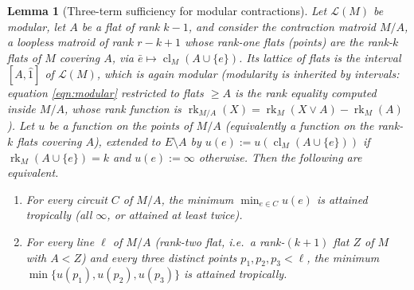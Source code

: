 \documentclass{article}
\newtheorem{lemma}[theorem]{Lemma}
\theoremstyle{definition}
\newcommand{\rk}{\operatorname{rk}}
\newcommand{\cl}{\operatorname{cl}}
\newcommand{\cLL}{\mathcal{L}}
\begin{document}
\begin{lemma}[Three-term sufficiency for modular contractions]\label{lem:modline-circuit}
Let $\cLL(M)$ be modular, let $A$ be a flat of rank $k-1$, and consider the contraction matroid
$M/A$, a loopless matroid of rank $r-k+1$ whose rank-one flats (points) are the rank-$k$ flats of $M$
covering $A$, via $\bar e\mapsto\cl_M(A\cup\{e\})$. Its lattice of flats is the interval $[A,\hat1]$ of
$\cLL(M)$, which is again modular (modularity is inherited by intervals: equation \eqref{eqn:modular}
restricted to flats $\ge A$ is the rank equality computed inside $M/A$, whose rank function is
$\rk_{M/A}(X)=\rk_M(X\vee A)-\rk_M(A)$). Let $u$ be a function on the points of $M/A$ (equivalently a
function on the rank-$k$ flats covering $A$), extended to $E\setminus A$ by $u(e):=u(\cl_M(A\cup\{e\}))$
if $\rk_M(A\cup\{e\})=k$ and $u(e):=\infty$ otherwise. Then the following are equivalent.
\begin{enumerate}
\item[\textup{(i)}] For every circuit $C$ of $M/A$, the minimum $\min_{e\in C}u(e)$ is attained
tropically (all $\infty$, or attained at least twice).
\item[\textup{(ii)}] For every \emph{line} $\ell$ of $M/A$ (rank-two flat, i.e.\ a rank-$(k+1)$ flat
$Z$ of $M$ with $A<Z$) and every three distinct points $p_1,p_2,p_3<\ell$, the minimum
$\min\{u(p_1),u(p_2),u(p_3)\}$ is attained tropically.
\end{enumerate}
\end{lemma}
\end{document}
